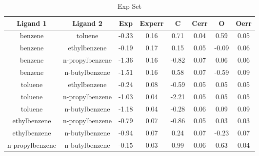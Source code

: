 \documentclass[T4paper.tex]{subfiles}
\begin{document}
\begin{table}[]
\centering
\caption{Exp Set}
\label{tbl:exp_set}
\begin{tabular}{|c|c|c|c|c|c|c|c|}
\hline
Ligand 1                                & Ligand 2                                & \textbf{Exp} & \textbf{Experr} & \textbf{C} & \textbf{Cerr} & \textbf{O} & \textbf{Oerr} \\ \hline
\cellcolor[HTML]{6434FC}benzene         & \cellcolor[HTML]{6434FC}toluene         & -0.33        & 0.16            & 0.71       & 0.04          & 0.59       & 0.05          \\ \hline
\cellcolor[HTML]{6434FC}benzene         & \cellcolor[HTML]{6434FC}ethylbenzene    & -0.19        & 0.17            & 0.15       & 0.05          & -0.09      & 0.06          \\ \hline
\cellcolor[HTML]{6434FC}benzene         & \cellcolor[HTML]{6434FC}n-propylbenzene & -1.36        & 0.16            & -0.82      & 0.07          & 0.06       & 0.06          \\ \hline
\cellcolor[HTML]{6434FC}benzene         & \cellcolor[HTML]{6434FC}n-butylbenzene  & -1.51        & 0.16            & 0.58       & 0.07          & -0.59      & 0.09          \\ \hline
\cellcolor[HTML]{6434FC}toluene         & \cellcolor[HTML]{6434FC}ethylbenzene    & -0.24        & 0.08            & -0.59      & 0.05          & 0.05       & 0.05          \\ \hline
\cellcolor[HTML]{6434FC}toluene         & \cellcolor[HTML]{6434FC}n-propylbenzene & -1.03        & 0.04            & -2.21      & 0.05          & 0.05       & 0.05          \\ \hline
\cellcolor[HTML]{6434FC}toluene         & \cellcolor[HTML]{6434FC}n-butylbenzene  & -1.18        & 0.04            & -0.28      & 0.06          & 0.09       & 0.09          \\ \hline
\cellcolor[HTML]{6434FC}ethylbenzene    & \cellcolor[HTML]{6434FC}n-propylbenzene & -0.79        & 0.07            & -0.86      & 0.05          & 0.03       & 0.03          \\ \hline
\cellcolor[HTML]{6434FC}ethylbenzene    & \cellcolor[HTML]{6434FC}n-butylbenzene  & -0.94        & 0.07            & 0.24       & 0.07          & -0.23      & 0.07          \\ \hline
\cellcolor[HTML]{6434FC}n-propylbenzene & \cellcolor[HTML]{6434FC}n-butylbenzene  & -0.15        & 0.03            & 0.99       & 0.06          & 0.63       & 0.04          \\ \hline
\end{tabular}
\end{table}
\end{document}
